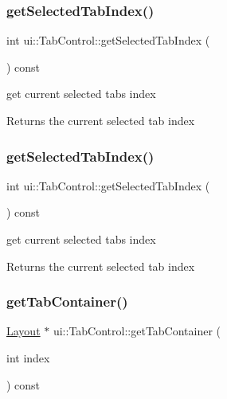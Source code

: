 \subsubsection{\texorpdfstring{get\+Selected\+Tab\+Index()}{getSelectedTabIndex()}\hspace{0.1cm}{\footnotesize\ttfamily [1/2]}}
{\footnotesize\ttfamily int ui\+::\+Tab\+Control\+::get\+Selected\+Tab\+Index (\begin{DoxyParamCaption}{ }\end{DoxyParamCaption}) const}

get current selected tab\textquotesingle{}s index \begin{DoxyReturn}{Returns}
the current selected tab index 
\end{DoxyReturn}
\mbox{\label{classui_1_1TabControl_ac446282790475b8afcfe3e5b81afac2a}} 
\subsubsection{\texorpdfstring{get\+Selected\+Tab\+Index()}{getSelectedTabIndex()}\hspace{0.1cm}{\footnotesize\ttfamily [2/2]}}
{\footnotesize\ttfamily int ui\+::\+Tab\+Control\+::get\+Selected\+Tab\+Index (\begin{DoxyParamCaption}{ }\end{DoxyParamCaption}) const}

get current selected tab\textquotesingle{}s index \begin{DoxyReturn}{Returns}
the current selected tab index 
\end{DoxyReturn}
\mbox{\label{classui_1_1TabControl_a08df77bcf0df42001144f4a77f1291cd}} 
\subsubsection{\texorpdfstring{get\+Tab\+Container()}{getTabContainer()}\hspace{0.1cm}{\footnotesize\ttfamily [1/2]}}
{\footnotesize\ttfamily \hyperlink{classui_1_1Layout}{Layout} $\ast$ ui\+::\+Tab\+Control\+::get\+Tab\+Container (\begin{DoxyParamCaption}\item[{int}]{index }\end{DoxyParamCaption}) const}

